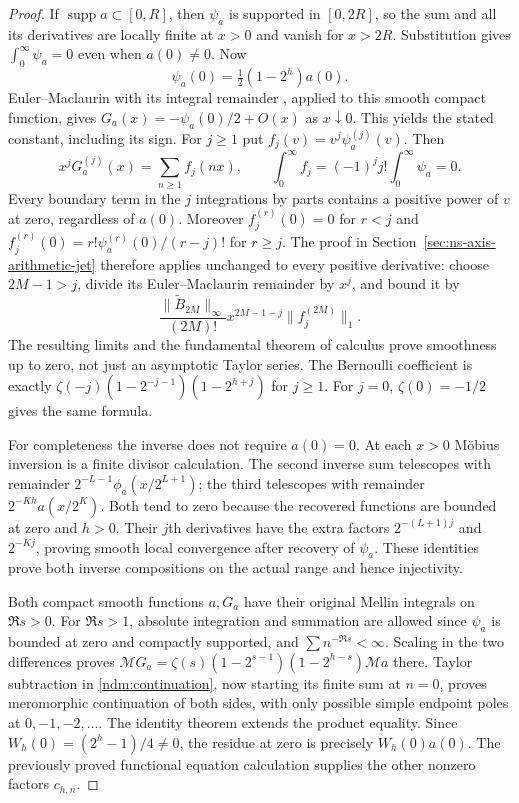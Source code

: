\begin{proof}
If $\operatorname{supp}a\subset[0,R]$, then $\psi_a$ is supported
in $[0,2R]$, so the sum and all its derivatives are locally finite at
$x>0$ and vanish for $x>2R$. Substitution gives
$\int_0^\infty\psi_a=0$ even when $a(0)\ne0$. Now
\[
 \psi_a(0)=\tfrac12(1-2^h)a(0).
\]
Euler--Maclaurin with its integral remainder
\cite[\S2.10(i)]{olverDLMF2}, applied to this smooth compact function,
gives $G_a(x)=-\psi_a(0)/2+O(x)$ as $x\downarrow0$.
This yields the stated constant, including its sign. For $j\geq1$ put
$f_j(v)=v^j\psi_a^{(j)}(v)$. Then
\[
 x^jG_a^{(j)}(x)=\sum_{n\geq1}f_j(nx),\qquad
 \int_0^\infty f_j=(-1)^jj!\int_0^\infty\psi_a=0.
\]
Every boundary term in the $j$ integrations by parts contains a positive
power of $v$ at zero, regardless of $a(0)$. Moreover
$f_j^{(r)}(0)=0$ for $r<j$ and
$f_j^{(r)}(0)=r!\psi_a^{(r)}(0)/(r-j)!$ for $r\geq j$.
The proof in Section~\ref{sec:ns-axis-arithmetic-jet} therefore applies
unchanged to every positive derivative: choose $2M-1>j$, divide its
Euler--Maclaurin remainder by $x^j$, and bound it by
\[
 \frac{\|\widetilde B_{2M}\|_\infty}{(2M)!}
 x^{2M-1-j}\|f_j^{(2M)}\|_1.
\]
The resulting limits and the fundamental theorem of calculus prove
smoothness up to zero, not just an asymptotic Taylor series. The Bernoulli
coefficient is exactly $\zeta(-j)(1-2^{-j-1})(1-2^{h+j})$ for $j\geq1$.
For $j=0$, $\zeta(0)=-1/2$ gives the same formula.

For completeness the inverse does not require $a(0)=0$. At each $x>0$
M\"obius inversion is a finite divisor calculation. The second inverse
sum telescopes with remainder $2^{-L-1}\phi_a(x/2^{L+1})$; the third
telescopes with remainder $2^{-Kh}a(x/2^K)$. Both tend to zero because
the recovered functions are bounded at zero and $h>0$. Their $j$th
derivatives have the extra factors $2^{-(L+1)j}$ and $2^{-Kj}$, proving
smooth local convergence after recovery of $\psi_a$. These identities
prove both inverse compositions on the actual range and hence injectivity.

Both compact smooth functions $a,G_a$ have their original Mellin integrals
on $\Re s>0$. For $\Re s>1$, absolute integration and summation are allowed since
$\psi_a$ is bounded at zero and compactly supported, and
$\sum n^{-\Re s}<\infty$. Scaling in the two differences proves
$\mathcal M G_a=\zeta(s)(1-2^{s-1})(1-2^{h-s})\mathcal M a$ there.
Taylor subtraction in \eqref{ndm:continuation}, now starting its finite
sum at $n=0$, proves meromorphic continuation of both sides, with only
possible simple endpoint poles at $0,-1,-2,\ldots$. The identity theorem
extends the product equality. Since $W_h(0)=(2^h-1)/4\ne0$, the residue
at zero is precisely $W_h(0)a(0)$. The previously proved functional
equation calculation supplies the other nonzero factors $c_{h,n}$.
\end{proof}

